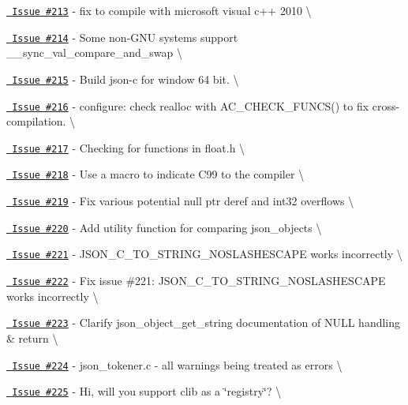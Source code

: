 \begin{DoxyItemize}
\item \href{https://github.com/json-c/json-c/issues/213}{\texttt{ Issue \#213}} -\/ fix to compile with microsoft visual c++ 2010 \textbackslash{}
\item \href{https://github.com/json-c/json-c/issues/214}{\texttt{ Issue \#214}} -\/ Some non-\/\+GNU systems support \+\_\+\+\_\+sync\+\_\+val\+\_\+compare\+\_\+and\+\_\+swap \textbackslash{}
\item \href{https://github.com/json-c/json-c/issues/215}{\texttt{ Issue \#215}} -\/ Build json-\/c for window 64 bit. \textbackslash{}
\item \href{https://github.com/json-c/json-c/issues/216}{\texttt{ Issue \#216}} -\/ configure\+: check realloc with AC\+\_\+\+CHECK\+\_\+\+FUNCS() to fix cross-\/compilation. \textbackslash{}
\item \href{https://github.com/json-c/json-c/issues/217}{\texttt{ Issue \#217}} -\/ Checking for functions in float.\+h \textbackslash{}
\item \href{https://github.com/json-c/json-c/issues/218}{\texttt{ Issue \#218}} -\/ Use a macro to indicate C99 to the compiler \textbackslash{}
\item \href{https://github.com/json-c/json-c/issues/219}{\texttt{ Issue \#219}} -\/ Fix various potential null ptr deref and int32 overflows \textbackslash{}
\item \href{https://github.com/json-c/json-c/issues/220}{\texttt{ Issue \#220}} -\/ Add utility function for comparing json\+\_\+objects \textbackslash{}
\item \href{https://github.com/json-c/json-c/issues/221}{\texttt{ Issue \#221}} -\/ JSON\+\_\+\+C\+\_\+\+TO\+\_\+\+STRING\+\_\+\+NOSLASHESCAPE works incorrectly \textbackslash{}
\item \href{https://github.com/json-c/json-c/issues/222}{\texttt{ Issue \#222}} -\/ Fix issue \#221\+: JSON\+\_\+\+C\+\_\+\+TO\+\_\+\+STRING\+\_\+\+NOSLASHESCAPE works incorrectly \textbackslash{}
\item \href{https://github.com/json-c/json-c/issues/223}{\texttt{ Issue \#223}} -\/ Clarify json\+\_\+object\+\_\+get\+\_\+string documentation of NULL handling \& return \textbackslash{}
\item \href{https://github.com/json-c/json-c/issues/224}{\texttt{ Issue \#224}} -\/ json\+\_\+tokener.\+c -\/ all warnings being treated as errors \textbackslash{}
\item \href{https://github.com/json-c/json-c/issues/225}{\texttt{ Issue \#225}} -\/ Hi, will you support clib as a \char`\"{}registry\char`\"{}? \textbackslash{}

\end{DoxyItemize}
